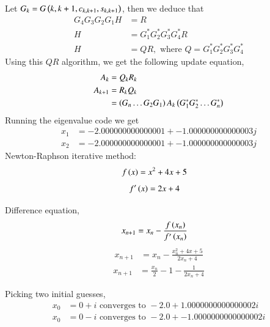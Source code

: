 \documentclass[journal]{IEEEtran}
\begin{document}
Let $G_k = G\left(k, k + 1, c_{k, k+1}, s_{k, k+1}\right)$, then we deduce that
\begin{align}
	G_4 G_3 G_2 G_1 H &= R\\
	H &= G_1^{\ast} G_2^{\ast} G_3^{\ast} G_4^{\ast} R\\
	H &= QR, \text{ where } Q = G_1^{\ast} G_2^{\ast} G_3^{\ast} G_4^{\ast}
\end{align}
Using this $QR$ algorithm, we get the following update equation,
\begin{align}
	A_{k} &= Q_{k}R_{k}\\
	A_{k + 1} &= R_{k}Q_{k}\\
	&= \left(G_{n}\dots G_{2} G_{1}\right) A_{k} \left(G_1^{\ast} G_2^{\ast} \dots G_n^{\ast}\right)
\end{align}
Running the eigenvalue code we get
\begin{align}
	x_1 &=  -2.000000000000001 + -1.000000000000003j
\end{align}
\begin{align}
	x_2 &=  -2.000000000000001 + -1.000000000000003j
\end{align}
Newton-Raphson iterative method:
\begin{align}
    f\left(x\right) &= x^2 + 4x +5
\end{align}
\begin{align}
    f^\prime\left(x\right) &= 2x +4
\end{align}

Difference equation,
\begin{align}
    x_{n+1} &= x_n - \frac{f\left(x_{n}\right)}{f^\prime\left(x_n\right)}
\end{align}
\begin{align}
    x_{n+1} &= x_n - \frac{x_n^2 + 4x+5}{2x_n+4}
\end{align}
\begin{align}
    x_{n+1} &= \frac{x_n}{2} - 1-\frac{1}{2x_n +4}
\end{align}

Picking two initial guesses,
\begin{align}
     x_0&=0+i \text{ converges to } -2.0 + 1.0000000000000002i\\
     x_0&=0-i \text{ converges to } -2.0 + -1.0000000000000002i
\end{align}
\end{document}
